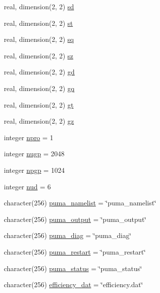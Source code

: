 \begin{DoxyCompactItemize}
\item 
real, dimension(2, 2) \hyperlink{classpumamod_a9bd99450c5fc8037436814f7b574e29f}{sd}
\item 
real, dimension(2, 2) \hyperlink{classpumamod_a74c9dc30cb632807156f147f54448742}{st}
\item 
real, dimension(2, 2) \hyperlink{classpumamod_a94eae8b357e81b00aec6660f112b76b0}{sq}
\item 
real, dimension(2, 2) \hyperlink{classpumamod_acdc2f913a6792772fcb9a2ebf1b0b043}{sz}
\item 
real, dimension(2, 2) \hyperlink{classpumamod_a00b4d8ae29f6999627d3b93cdfcec1ea}{gd}
\item 
real, dimension(2, 2) \hyperlink{classpumamod_abcc9eef5e9aa5ecf04a6d77fd888feb9}{gq}
\item 
real, dimension(2, 2) \hyperlink{classpumamod_a19345ffa11bc96c6b5a16f205d54d59c}{gt}
\item 
real, dimension(2, 2) \hyperlink{classpumamod_a0e0c4c718b441b61b728ccb5b97b8184}{gz}
\item 
integer \hyperlink{classpumamod_ae915be5ffac65dd8af555f2d75153398}{npro} = 1
\item 
integer \hyperlink{classpumamod_aa9e811d28ba93c3dadb44bc26ae09600}{nugp} = 2048
\item 
integer \hyperlink{classpumamod_ac20b6aa2c443341280ab5e4ddc9bebd7}{npgp} = 1024
\item 
integer \hyperlink{classpumamod_ab963b44aa3f4546a551dd941e4e322c8}{nud} = 6
\item 
character(256) \hyperlink{classpumamod_a71c27dcf11504a05aa050a3ee4d436d1}{puma\-\_\-namelist} = \char`\"{}puma\-\_\-namelist\char`\"{}
\item 
character(256) \hyperlink{classpumamod_a047f25dcb732cdf09b1f74fd3115126a}{puma\-\_\-output} = \char`\"{}puma\-\_\-output\char`\"{}
\item 
character(256) \hyperlink{classpumamod_ad11e2fd3e6aa83543bbc8acd0c59b7a0}{puma\-\_\-diag} = \char`\"{}puma\-\_\-diag\char`\"{}
\item 
character(256) \hyperlink{classpumamod_a98f71e6dad074de1b2cb0fd1c5e531c3}{puma\-\_\-restart} = \char`\"{}puma\-\_\-restart\char`\"{}
\item 
character(256) \hyperlink{classpumamod_ab188caa1d64091345227ae3bf0e83edd}{puma\-\_\-status} = \char`\"{}puma\-\_\-status\char`\"{}
\item 
character(256) \hyperlink{classpumamod_a5f70e9c47b9e4690322963b92bb809de}{efficiency\-\_\-dat} = \char`\"{}efficiency.\-dat\char`\"{}

\end{DoxyCompactItemize}
